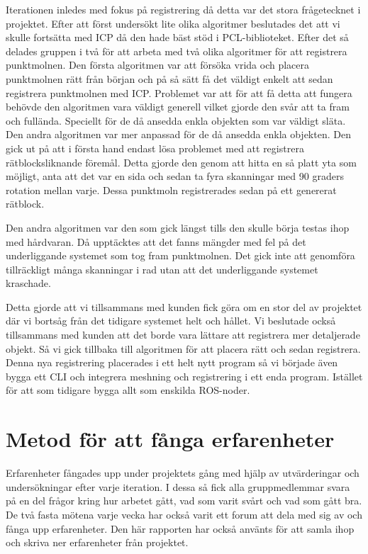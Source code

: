 Iterationen inledes med fokus på registrering då detta var det stora frågetecknet i projektet. Efter att först undersökt lite olika algoritmer beslutades det att vi skulle fortsätta med ICP då den hade bäst stöd i PCL-biblioteket. Efter det så delades gruppen i två för att arbeta med två olika algoritmer för att registrera punktmolnen. Den första algoritmen var att försöka vrida och placera punktmolnen rätt från början och på så sätt få det väldigt enkelt att sedan registrera punktmolnen med ICP. Problemet var att för att få detta att fungera behövde den algoritmen vara väldigt generell vilket gjorde den svår att ta fram och fullända. Speciellt för de då ansedda enkla objekten som var väldigt släta. Den andra algoritmen var mer anpassad för de då ansedda enkla objekten. Den gick ut på att i första hand endast lösa problemet med att registrera rätblocksliknande föremål. Detta gjorde den genom att hitta en så platt yta som möjligt, anta att det var en sida och sedan ta fyra skanningar med 90 graders rotation mellan varje. Dessa punktmoln registrerades sedan på ett genererat rätblock. 

Den andra algoritmen var den som gick längst tills den skulle börja testas ihop med hårdvaran. Då upptäcktes att det fanns mängder med fel på det underliggande systemet som tog fram punktmolnen. Det gick inte att genomföra tillräckligt många skanningar i rad utan att det underliggande systemet kraschade. 

Detta gjorde att vi tillsammans med kunden fick göra om en stor del av projektet där vi bortsåg från det tidigare systemet helt och hållet. Vi beslutade också tillsammans med kunden att det borde vara lättare att registrera mer detaljerade objekt. Så vi gick tillbaka till algoritmen för att placera rätt och sedan registrera. Denna nya registrering placerades i ett helt nytt program så vi började även bygga ett CLI och integrera meshning och registrering i ett enda program. Istället för att som tidigare bygga allt som enskilda ROS-noder. 

\section{Metod för att fånga erfarenheter}

Erfarenheter fångades upp under projektets gång med hjälp av utvärderingar och undersökningar efter varje iteration. I dessa så fick alla gruppmedlemmar svara på en del frågor kring hur arbetet gått, vad som varit svårt och vad som gått bra. De två fasta mötena varje vecka har också varit ett forum att dela med sig av och fånga upp erfarenheter. Den här rapporten har också använts för att samla ihop och skriva ner erfarenheter från projektet. 


